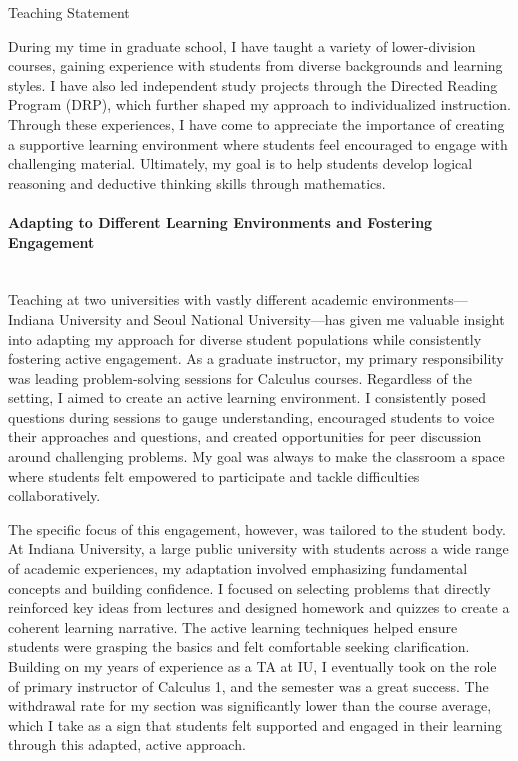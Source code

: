 \documentclass[11pt]{article}
\begin{document}
\begin{center}
\Large{Teaching Statement}
\end{center}

During my time in graduate school, I have taught a variety of lower-division courses, gaining experience with students from diverse backgrounds and learning styles. I have also led independent study projects through the Directed Reading Program (DRP), which further shaped my approach to individualized instruction. Through these experiences, I have come to appreciate the importance of creating a supportive learning environment where students feel encouraged to engage with challenging material. Ultimately, my goal is to help students develop logical reasoning and deductive thinking skills through mathematics.

\paragraph{Adapting to Different Learning Environments and Fostering Engagement}\quad \\
Teaching at two universities with vastly different academic environments—Indiana University and Seoul National University—has given me valuable insight into adapting my approach for diverse student populations while consistently fostering active engagement. As a graduate instructor, my primary responsibility was leading problem-solving sessions for Calculus courses. Regardless of the setting, I aimed to create an active learning environment. I consistently posed questions during sessions to gauge understanding, encouraged students to voice their approaches and questions, and created opportunities for peer discussion around challenging problems. My goal was always to make the classroom a space where students felt empowered to participate and tackle difficulties collaboratively.

The specific focus of this engagement, however, was tailored to the student body. At Indiana University, a large public university with students across a wide range of academic experiences, my adaptation involved emphasizing fundamental concepts and building confidence. I focused on selecting problems that directly reinforced key ideas from lectures and designed homework and quizzes to create a coherent learning narrative. The active learning techniques helped ensure students were grasping the basics and felt comfortable seeking clarification. Building on my years of experience as a TA at IU, I eventually took on the role of primary instructor of Calculus 1, and the semester was a great success. The withdrawal rate for my section was significantly lower than the course average, which I take as a sign that students felt supported and engaged in their learning through this adapted, active approach.
\end{document}
